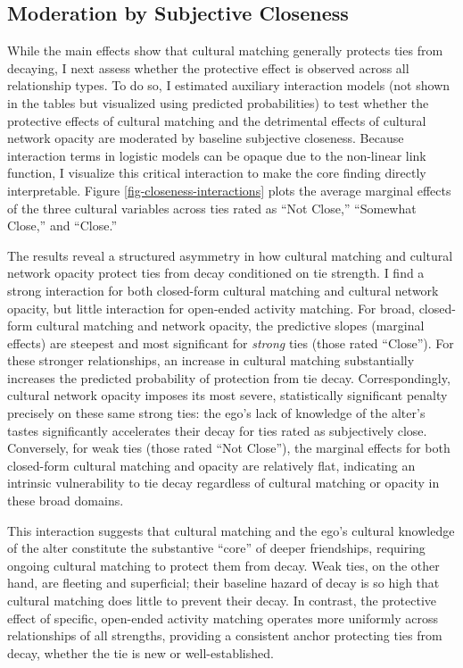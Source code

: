 \documentclass[12pt,letterpaper]{article}
\begin{document}



\subsection{Moderation by Subjective Closeness}\label{moderation-by-closeness}

While the main effects show that cultural matching generally protects ties from decaying, I next assess whether the protective effect is observed across all relationship types. To do so, I estimated auxiliary interaction models (not shown in the tables but visualized using predicted probabilities) to test whether the protective effects of cultural matching and the detrimental effects of cultural network opacity are moderated by baseline subjective closeness. Because interaction terms in logistic models can be opaque due to the non-linear link function, I visualize this critical interaction to make the core finding directly interpretable. Figure \ref{fig-closeness-interactions} plots the average marginal effects of the three cultural variables across ties rated as ``Not Close,'' ``Somewhat Close,'' and ``Close.''

The results reveal a structured asymmetry in how cultural matching and cultural network opacity protect ties from decay conditioned on tie strength. I find a strong interaction for both closed-form cultural matching and cultural network opacity, but little interaction for open-ended activity matching. For broad, closed-form cultural matching and network opacity, the predictive slopes (marginal effects) are steepest and most significant for \textit{strong} ties (those rated ``Close''). For these stronger relationships, an increase in cultural matching substantially increases the predicted probability of protection from tie decay. Correspondingly, cultural network opacity imposes its most severe, statistically significant penalty precisely on these same strong ties: the ego's lack of knowledge of the alter's tastes significantly accelerates their decay for ties rated as subjectively close. Conversely, for weak ties (those rated ``Not Close''), the marginal effects for both closed-form cultural matching and opacity are relatively flat, indicating an intrinsic vulnerability to tie decay regardless of cultural matching or opacity in these broad domains.

This interaction suggests that cultural matching and the ego's cultural knowledge of the alter constitute the substantive ``core'' of deeper friendships, requiring ongoing cultural matching to protect them from decay. Weak ties, on the other hand, are fleeting and superficial; their baseline hazard of decay is so high that cultural matching does little to prevent their decay. In contrast, the protective effect of specific, open-ended activity matching operates more uniformly across relationships of all strengths, providing a consistent anchor protecting ties from decay, whether the tie is new or well-established.
\end{document}
